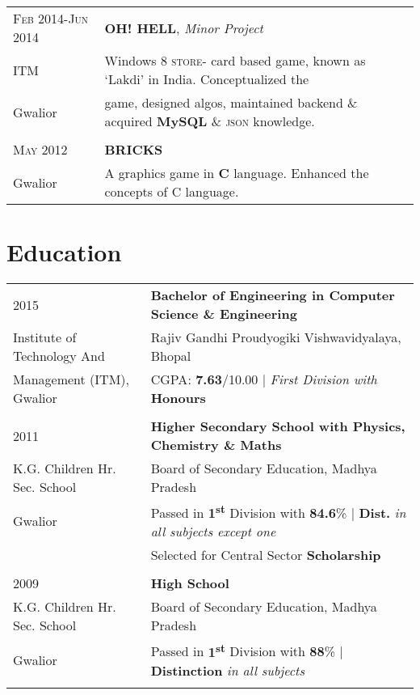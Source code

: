 \documentclass[a4paper,10pt]{article} %
\begin{document}
\begin{tabular}{l|p{11cm}}

\textsc{Feb 2014-Jun 2014} & \textbf{OH! HELL}, \emph{Minor Project} \emph{}\\
ITM & \footnotesize{Windows 8 \textsc{store}- card based game, known as ‘Lakdi’ in India. Conceptualized the}\\
Gwalior & \footnotesize{game, designed algos, maintained backend \& acquired \textbf{MySQL} \& \textsc{json} knowledge.}\\
\multicolumn{2}{c}{} \\


\textsc{May 2012} & \textbf{BRICKS} \emph{}\\
Gwalior & \footnotesize{A graphics game in \textbf{C} language. Enhanced the concepts of C language.}
\end{tabular}


\section{Education}

\begin{tabular}{ll}	
2015 & \textbf{Bachelor of Engineering in Computer Science \& Engineering}\\
Institute of Technology And & Rajiv Gandhi Proudyogiki Vishwavidyalaya, Bhopal\\
Management (ITM), Gwalior &\normalsize \textsc{CGPA}: \textbf{7.63}/10.00 | \small\emph{First Division with} \textbf{Honours}\\
&\\


2011 & \textbf{Higher Secondary School with Physics, Chemistry \& Maths} \\
K.G. Children Hr. Sec. School & Board of Secondary Education, Madhya Pradesh\\
Gwalior & Passed in \textbf{1\textsuperscript{st}} Division with \textbf{84.6}\% | \textbf{Dist.} \small\emph{in all subjects except one}\\
& Selected for Central Sector \textbf{Scholarship}\\
&\\


2009 & \textbf{High School}\\
K.G. Children Hr. Sec. School & Board of Secondary Education, Madhya Pradesh\\
Gwalior & Passed in \textbf{1\textsuperscript{st}} Division with \textbf{88}\% | \textbf{Distinction} \small\emph{in all subjects}\\
&\\
\end{tabular}
\end{document}
